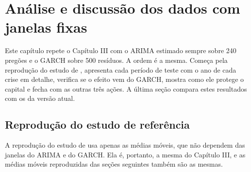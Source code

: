 %
\chapter{Análise e discussão dos dados com janelas fixas}

Este capítulo repete o Capítulo III com o ARIMA estimado sempre sobre 240
pregões e o GARCH sobre 500 resíduos. A ordem é a mesma. Começa pela reprodução
do estudo de , apresenta cada período de teste com o ano
de cada crise em detalhe, verifica se o efeito vem do GARCH, mostra como ele
protege o capital e fecha com as outras três ações. A última seção compara estes
resultados com os da versão atual.

\section{Reprodução do estudo de referência}

A reprodução do estudo de  usa apenas as médias móveis,
que não dependem das janelas do ARIMA e do GARCH. Ela é, portanto, a mesma do
Capítulo III, e as médias móveis reproduzidas das seções seguintes também são as
mesmas.

